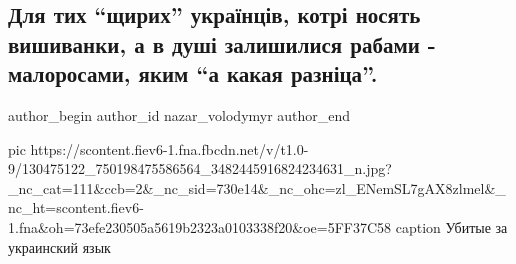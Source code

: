  
 
 
 
 
 
\subsection{Для тих \enquote{щирих} українців, котрі носять вишиванки, а в душі залишилися рабами - малоросами, яким \enquote{а какая разніца}.}
\label{sec:08_12_2020.fb.nazar_volodymyr.3.dja_rabiv}
\ifcmt
	author_begin
   author_id nazar_volodymyr
	author_end
\fi

\ifcmt
pic https://scontent.fiev6-1.fna.fbcdn.net/v/t1.0-9/130475122_750198475586564_3482445916824234631_n.jpg?_nc_cat=111&ccb=2&_nc_sid=730e14&_nc_ohc=zl_ENemSL7gAX8zlmel&_nc_ht=scontent.fiev6-1.fna&oh=73efe230505a5619b2323a0103338f20&oe=5FF37C58
caption Убитые за украинский язык
\fi

